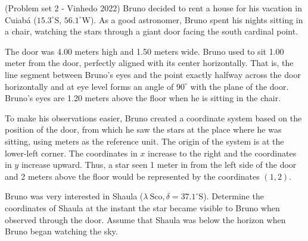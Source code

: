 \documentclass[11pt]{article}
\begin{document}
\begin{pproblem}(Problem set 2 - Vinhedo 2022) 
    Bruno decided to rent a house for his vacation in Cuiabá ($15.3^{\circ} \text{S}$, $56.1^{\circ} \text{W}$). As a good astronomer, Bruno spent his nights sitting in a chair, watching the stars through a giant door facing the south cardinal point.

    The door was 4.00 meters high and 1.50 meters wide. Bruno used to sit
    1.00 meter from the door, perfectly aligned with its center horizontally. That is, the line
    segment between Bruno's eyes and the point exactly halfway across the door horizontally and
    at eye level forms an angle of $90^{\circ}$ with the plane of the door. Bruno's eyes are
    1.20 meters above the floor when he is sitting in the chair.
    
    To make his observations easier, Bruno created a coordinate system based on the position of the
    door, from which he saw the stars at the place where he was sitting, using meters as
    the reference unit. The origin of the system is at the lower-left corner. The coordinates
    in $x$ increase to the right and the coordinates in $y$ increase upward. Thus, a
    star seen 1 meter in from the left side of the door and 2 meters above the floor would be represented
    by the coordinates $(1, 2)$.
    
    Bruno was very interested in Shaula ($\lambda \ \text{Sco}, \delta = 37.1^{\circ} \text{S}$). Determine the coordinates of
    Shaula at the instant the star became visible to Bruno when observed through the door. Assume that Shaula was below the horizon when Bruno began watching the sky.
\end{pproblem}
\end{document}
